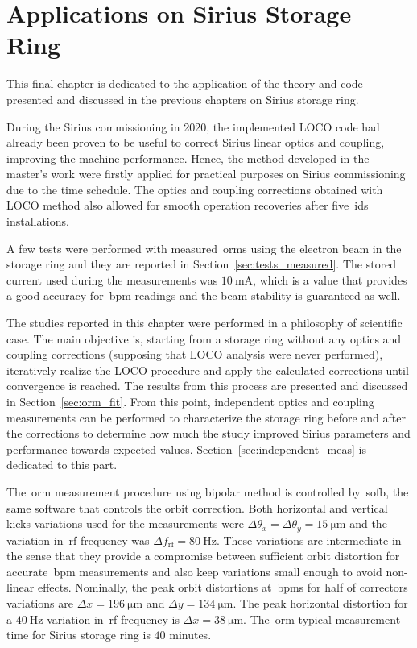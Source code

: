 \chapter{Applications on Sirius Storage Ring}

This final chapter is dedicated to the application of the theory and code presented and discussed in the previous chapters on Sirius storage ring. 

During the Sirius commissioning in 2020, the implemented LOCO code had already been proven to be useful to correct Sirius linear optics and coupling, improving the machine performance. Hence, the method developed in the master's work were firstly applied for practical purposes on Sirius commissioning due to the time schedule. The optics and coupling corrections obtained with LOCO method also allowed for smooth operation recoveries after five~\glspl{id} installations.

A few tests were performed with measured~\glspl{orm} using the electron beam in the storage ring and they are reported in Section~\ref{sec:tests_measured}. The stored current used during the measurements was $\SI{10}{\milli\ampere}$, which is a value that provides a good accuracy for~\gls{bpm} readings and the beam stability is guaranteed as well.

The studies reported in this chapter were performed in a philosophy of scientific case. The main objective is, starting from a storage ring without any optics and coupling corrections (supposing that LOCO analysis were never performed), iteratively realize the LOCO procedure and apply the calculated corrections until convergence is reached. The results from this process are presented and discussed in Section~\ref{sec:orm_fit}. From this point, independent optics and coupling measurements can be performed to characterize the storage ring before and after the corrections to determine how much the study improved Sirius parameters and performance towards expected values. Section~\ref{sec:independent_meas} is dedicated to this part.

The~\gls{orm} measurement procedure using bipolar method is controlled by~\gls{sofb}, the same software that controls the orbit correction. Both horizontal and vertical kicks variations used for the measurements were $\Delta \theta_x = \Delta \theta_y = \SI{15}{\micro\meter}$ and the variation in~\gls{rf} frequency was $\Delta f_{\mathrm{rf}} = \SI{80}{\hertz}$. These variations are intermediate in the sense that they provide a compromise between sufficient orbit distortion for accurate~\gls{bpm} measurements and also keep variations small enough to avoid non-linear effects. Nominally, the peak orbit distortions at~\glspl{bpm} for half of correctors variations are $\Delta x = \SI{196}{\micro\meter}$ and $\Delta y = \SI{134}{\micro\meter}$. The peak horizontal distortion for a $\SI{40}{\hertz}$ variation in~\gls{rf} frequency is $\Delta x = \SI{38}{\micro\meter}$. The~\gls{orm} typical measurement time for Sirius storage ring is $40$ minutes.

